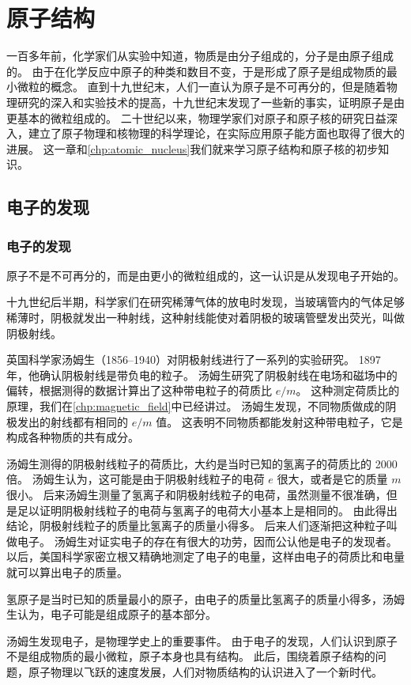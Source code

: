 \chapter{原子结构}\label{chp:atom_structure}
一百多年前，化学家们从实验中知道，物质是由分子组成的，分子是由原子组成的。
由于在化学反应中原子的种类和数目不变，于是形成了原子是组成物质的最小微粒的概念。
直到十九世纪末，人们一直认为原子是不可再分的，但是随着物理研究的深入和实验技术的提高，十九世纪末发现了一些新的事实，证明原子是由更基本的微粒组成的。
二十世纪以来，物理学家们对原子和原子核的研究日益深入，建立了原子物理和核物理的科学理论，在实际应用原子能方面也取得了很大的进展。
这一章和\cref{chp:atomic_nucleus}我们就来学习原子结构和原子核的初步知识。
\section{电子的发现}
\subsection{电子的发现}
原子不是不可再分的，而是由更小的微粒组成的，这一认识是从发现电子开始的。

十九世纪后半期，科学家们在研究稀薄气体的放电时发现，当玻璃管内的气体足够稀薄时，阴极就发出一种射线，这种射线能使对着阴极的玻璃管壁发出荧光，叫做阴极射线。

英国科学家汤姆生（1856--1940）对阴极射线进行了一系列的实验研究。
1897 年，他确认阴极射线是带负电的粒子。
汤姆生研究了阴极射线在电场和磁场中的偏转，根据测得的数据计算出了这种带电粒子的荷质比 $e/m$。
这种测定荷质比的原理，我们在\cref{chp:magnetic_field}中已经讲过。
汤姆生发现，不同物质做成的阴极发出的射线都有相同的 $e/m$ 值。
这表明不同物质都能发射这种带电粒子，它是构成各种物质的共有成分。

汤姆生测得的阴极射线粒子的荷质比，大约是当时已知的氢离子的荷质比的 2000 倍。
汤姆生认为，这可能是由于阴极射线粒子的电荷 $e$ 很大，或者是它的质量 $m$ 很小。
后来汤姆生测量了氢离子和阴极射线粒子的电荷，虽然测量不很准确，但是足以证明阴极射线粒子的电荷与氢离子的电荷大小基本上是相同的。
由此得出结论，阴极射线粒子的质量比氢离子的质量小得多。
后来人们逐渐把这种粒子叫做电子。
汤姆生对证实电子的存在有很大的功劳，因而公认他是电子的发现者。
以后，美国科学家密立根又精确地测定了电子的电量，这样由电子的荷质比和电量就可以算出电子的质量。

氢原子是当时已知的质量最小的原子，由电子的质量比氢离子的质量小得多，汤姆生认为，电子可能是组成原子的基本部分。

汤姆生发现电子，是物理学史上的重要事件。
由于电子的发现，人们认识到原子不是组成物质的最小微粒，原子本身也具有结构。
此后，围绕着原子结构的问题，原子物理以飞跃的速度发展，人们对物质结构的认识进入了一个新时代。

